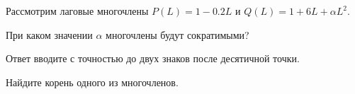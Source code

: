 
\begin{question}
Рассмотрим лаговые многочлены \(P(L) = 1 - 0.2 L\) и \(Q(L) = 1 + 6 L + \alpha L^2\).

При каком значении \(\alpha\) многочлены будут сократимыми?

Ответ вводите с точностью до двух знаков после десятичной точки.
\end{question}

\begin{solution}
Найдите корень одного из многочленов.
\end{solution}

